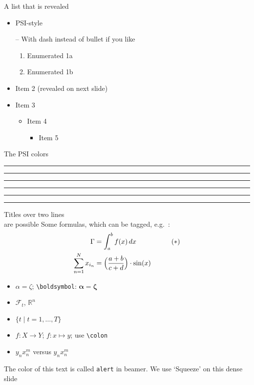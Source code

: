 \documentclass[aspectratio=169,t]{beamer}
\begin{document}
\begin{frame}{A list that is revealed}

  \begin{itemize}
  \item PSI-style 
  \item[--]  With dash instead of bullet if you like
    \begin{enumerate}
    \item Enumerated 1a
    \item Enumerated 1b
    \end{enumerate}
    \pause
  \item Item 2 (revealed on next slide)
    \pause
  \item Item 3
    \begin{itemize}
    \item Item 4
      \begin{itemize}
      \item Item 5
      \end{itemize}
    \end{itemize}
  \end{itemize}

\end{frame}



\begin{frame}{The PSI colors}

\textcolor{PSIgreen}{\rule{2cm}{1cm}}
\textcolor{PSIyellow}{\rule{2cm}{1cm}}
\textcolor{PSIpink}{\rule{2cm}{1cm}}
\textcolor{PSIblue}{\rule{2cm}{1cm}}
\textcolor{PSIred}{\rule{2cm}{1cm}}
\textcolor{PSIviolet}{\rule{2cm}{1cm}}


\end{frame}

\begin{frame}[squeeze]{Titles over two lines\\ are possible}
  Some formulas, which can be tagged, e.g.\ \thetag{$\ast$}:
  \begin{align*}
    \Gamma  & = \int_a^b f(x)\,dx             && \tag{$\ast$}\\
    \sum_{n=1}^N x_{i_n} &= \Bigl(\frac{a+b}{c+d}\Bigr)\cdot \sin(x)  &&
  \end{align*}
  \begin{itemize}
  \item  $\alpha = \zeta$; \texttt{\textbackslash boldsymbol}: $\boldsymbol{\alpha} = \boldsymbol{\zeta}$ 
  \item $\mathcal{F}_t$, $\mathbb{R}^n$
  \item $\{t \mid t=1,\dots,T\}$
  \item $f\colon X\to Y$; $f\colon x\mapsto y$; use \texttt{\textbackslash colon}
  \item $y_nx_n^m$ versus $y_n^{}x_n^m$
  \end{itemize}
   \alert{The color of this text is called \texttt{alert} in beamer. We use `Squeeze' on this dense slide}
  
\end{frame}
\end{document}
